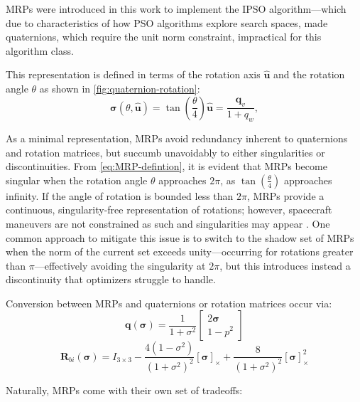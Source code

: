 \ac{MRP}s were introduced in this work to implement the \ac{IPSO} algorithm---which due to characteristics of how \ac{PSO} algorithms explore search spaces, made quaternions, which require the unit norm constraint, impractical for this algorithm class.

This representation is defined in terms of the rotation axis $\hat{\mathbf{u}}$ and the rotation angle $\theta$ \cite{Schuster93} as shown in \cref{fig:quaternion-rotation}:
\begin{equation}
\boldsymbol{\sigma}(\theta, \hat{\mathbf{u}})
= 
\tan\left(\frac{\theta}{4}\right) \hat{\mathbf{u}}
=
\frac{\mathbf{q}_v}{1+q_w},
\label{eq:MRP-defintion}
\end{equation}

As a minimal representation, \ac{MRP}s avoid redundancy inherent to quaternions and rotation matrices, but succumb unavoidably to either singularities or discontinuities.
From \cref{eq:MRP-defintion}, it is evident that \ac{MRP}s become singular when the rotation angle $\theta$ approaches $2\pi$, as $\tan\left(\frac{\theta}{4}\right)$ approaches infinity.
If the angle of rotation is bounded less than $2\pi$, \ac{MRP}s provide a continuous, singularity-free representation of rotations; however, spacecraft maneuvers are not constrained as such and singularities may appear \cite{Schuster93}.
One common approach to mitigate this issue is to switch to the shadow set of \ac{MRP}s when the norm of the current set exceeds unity---occurring for rotations greater than $\pi$---effectively avoiding the singularity at $2\pi$, but this introduces instead a discontinuity that optimizers struggle to handle.

Conversion between \ac{MRP}s and quaternions or rotation matrices occur via:
\begin{equation}
    \mathbf{q}(\boldsymbol{\sigma}) = \frac{1}{1 + \sigma^2}
    \begin{bmatrix} 
        2\boldsymbol{\sigma} \\
        1 - p^2 
    \end{bmatrix}
\label{eq:MRP2quat}
\end{equation}
\begin{equation}
    \mathbf{R}_{bi}(\boldsymbol{\sigma}) =
    I_{3 \times 3} - \frac{4(1 - \sigma^2)}{(1 + \sigma^2)^2}[\boldsymbol{\sigma}]_\times + \frac{8}{(1 + \sigma^2)^2}[\boldsymbol{\sigma}]_\times^2
\label{eq:MRP2rot}
\end{equation}

Naturally, \ac{MRP}s come with their own set of tradeoffs:

